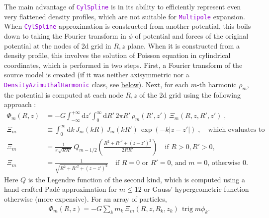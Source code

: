 \documentclass[12pt]{article}
\newcommand{\ttt}[1]{\textcolor{darkviolet}{\texttt{#1}}}
\renewcommand{\d}{\mathrm{d}}
\DeclareMathOperator{\trig}{trig}
\begin{document}
The main advantage of \ttt{CylSpline} is in its ability to efficiently represent even very flattened density profiles, which are not suitable for \ttt{Multipole} expansion. When \ttt{CylSpline} approximation is constructed from another potential, this boils down to taking the Fourier transform in $\phi$ of potential and forces of the original potential at the nodes of 2d grid in $R,z$ plane. When it is constructed from a density profile, this involves the solution of Poisson equation in cylindrical coordinates, which is performed in two steps. First, a Fourier transform of the source model is created (if it was neither axisymmetric nor a \ttt{DensityAzimuthalHarmonic} class, see \hyperref[sec:DensityAzimuthalHarmonic]{below}). Next, for each $m$-th harmonic $\rho_m$, the potential is computed at each node $R,z$ of the 2d grid using the following approach \cite{CohlTohline1999}:
\begin{align}
\Phi_m(R,z) &= -G \int_{-\infty}^{+\infty} \d z' \int_0^{\infty} \d R' \,2\pi R'\,\rho_m(R',z')  
  \,\Xi_m(R,z,R',z')\;,  \label{eq:PoissonCylindric} \\
\Xi_m &\equiv \int_0^\infty \d k\, J_m(kR)\, J_m(kR')\, \exp(-k|z-z'|) \;,\quad
  \mbox{which evaluates to} \\
\Xi_m&= \frac{1}{\pi\sqrt{RR'}}\, Q_{m-1/2}\left( \frac{R^2+R'^2+(z-z')^2}{2RR'} \right) \quad
  \mbox{if }R>0,R'>0,  \nonumber \\
\Xi_m&= \frac{1}{\sqrt{R^2+R'^2+(z-z')^2}}\quad
  \mbox{if }R=0\mbox{ or }R'=0\mbox{, and }m=0\mbox{, otherwise 0}. \nonumber
\end{align}
Here $Q$ is the Legendre function of the second kind, which is computed using a hand-crafted Pad\'e approximation for $m\le 12$ or Gauss' hypergeometric function otherwise (more expensive).
For an array of particles, 
\begin{align}  \label{eq:PoissonCylindricParticles}
\Phi_m(R,z) = -G \sum_k m_k\,\Xi_m(R,z,R_k,z_k)\,\trig m\phi_k .
\end{align}
\end{document}
